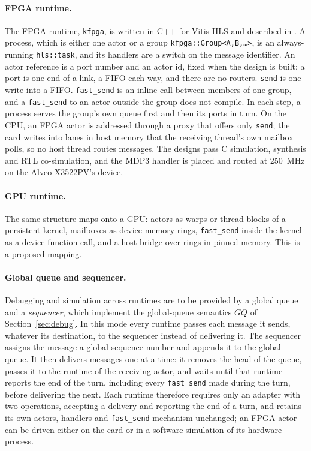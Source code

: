 \documentclass[11pt]{article}
\theoremstyle{definition}
\theoremstyle{remark}
\newcommand{\fs}{\texttt{fast\_send}}
\newcommand{\snd}{\texttt{send}}
\begin{document}
\paragraph{FPGA runtime.} The FPGA runtime, \texttt{kfpga}, is written in C++ for Vitis
HLS and described in \cite{fpgaactors}. A process, which is either one actor or a group
\texttt{kfpga::Group<A,B,\ldots>}, is an always-running \texttt{hls::task}, and its
handlers are a switch on the message identifier. An actor reference is a port number and
an actor id, fixed when the design is built; a port is one end of a link, a FIFO each
way, and there are no routers. \snd{} is one write into a FIFO. \fs{} is an inline call
between members of one group, and a \fs{} to an actor outside the group does not compile.
In each step, a process serves the group's own queue first and then its ports in turn.
On the CPU, an FPGA actor is addressed through a proxy that offers only \snd{}; the card
writes into lanes in host memory that the receiving thread's own mailbox polls, so no
host thread routes messages. The designs pass C simulation, synthesis and RTL co-simulation,
and the MDP3 handler is placed and routed at 250~MHz on the Alveo X3522PV's device.

\paragraph{GPU runtime.} The same structure maps onto a GPU: actors as warps or thread
blocks of a persistent kernel, mailboxes as device-memory rings, \fs{} inside the kernel as
a device function call, and a host bridge over rings in pinned memory. This is a
proposed mapping.

\paragraph{Global queue and sequencer.} Debugging and simulation across runtimes are to
be provided by a global queue and a \emph{sequencer}, which implement the global-queue
semantics $\mathit{GQ}$ of Section~\ref{sec:debug}. In this mode every runtime
passes each message it sends, whatever its destination, to the sequencer instead of
delivering it. The sequencer assigns the message a global sequence number and appends it
to the global queue. It then delivers messages one at a time: it removes the head of the
queue, passes it to the runtime of the receiving actor, and waits until that runtime
reports the end of the turn, including every \fs{} made during the turn, before
delivering the next. Each runtime therefore requires only an adapter with two
operations, accepting a delivery and reporting the end of a turn, and retains its own
actors, handlers and \fs{} mechanism unchanged; an FPGA actor can be driven either on the
card or in a software simulation of its hardware process.
\end{document}
